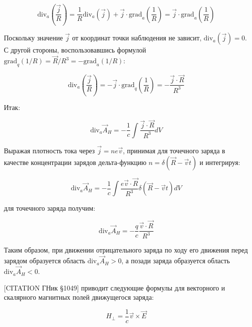 \documentclass[12pt, a4paper]{article}
\begin{document}
\begin{equation}
\text{div}_a \left( \frac{\vec{j}}{R} \right) = \frac{1}{R} \text{div}_a(\vec{j}) + \vec{j} \cdot \text{grad}_a \left( \frac{1}{R} \right) = \vec{j} \cdot \text{grad}_a \left( \frac{1}{R} \right)
\label{eq:div_j_over_R}
\end{equation}

Поскольку значение $\vec{j}$ от координат точки наблюдения не зависит, $\text{div}_a(\vec{j}) = 0$. С другой стороны, воспользовавшись формулой $\text{grad}_q(1/R) = \vec{R}/R^3 = -\text{grad}_a(1/R)$:

\begin{equation}
\text{div}_a \left( \frac{\vec{j}}{R} \right) = -\vec{j} \cdot \text{grad}_q \left( \frac{1}{R} \right) = -\frac{\vec{j} \cdot \vec{R}}{R^3}
\label{eq:div_j_over_R_final}
\end{equation}

Итак:

\begin{equation}
\text{div}_a \vec{A}_H = -\frac{1}{c} \int \frac{\vec{j} \cdot \vec{R}}{R^3} dV
\label{eq:div_A_result}
\end{equation}

Выражая плотность тока через $\vec{j} = ne\vec{v}$, принимая для точечного заряда в качестве концентрации зарядов дельта-функцию $n = \delta(\vec{R} - \vec{v}t)$ и интегрируя:

\begin{equation}
\text{div}_a \vec{A}_H = -\frac{1}{c} \int \frac{e\vec{v} \cdot \vec{R}}{R^3} \delta(\vec{R} - \vec{v}t) dV
\label{eq:div_A_point}
\end{equation}

для точечного заряда получим:

\begin{equation}
\text{div}_a \vec{A}_H = -\frac{q}{c} \frac{\vec{v} \cdot \vec{R}}{R^3}
\label{eq:div_A_point_final}
\end{equation}

Таким образом, при движении отрицательного заряда по ходу его движения перед зарядом образуется область $\text{div}_a \vec{A}_H > 0$, а позади заряда образуется область $\text{div}_a \vec{A}_H < 0$.

[CITATION ГНик §1049] приводит следующие формулы для векторного и скалярного магнитных полей движущегося заряда:

\begin{equation}
H_{\perp} = \frac{1}{c} \vec{v} \times \vec{E}
\label{eq:H_perp}
\end{equation}
\end{document}
